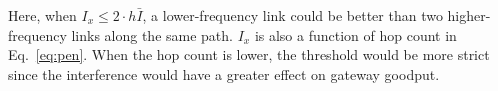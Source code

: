 Here, when $I_x \leq 2\cdot h\bar{I}$, a lower-frequency link could 
be better than two higher-frequency links along the same path. $I_x$ is also a function of hop count 
in Eq.~\ref{eq:pen}. When the hop count is lower, the threshold would be more strict since the
interference would have a greater effect on gateway goodput.



